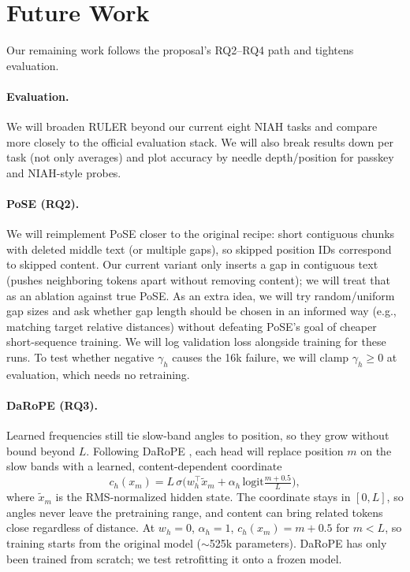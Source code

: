 \documentclass[11pt]{article}
\begin{document}


\section{Future Work}
\label{sec:future}
\label{sec:plan}

Our remaining work follows the proposal's RQ2--RQ4 path and tightens evaluation.

\paragraph{Evaluation.}
We will broaden RULER beyond our current eight NIAH tasks and compare more closely
to the official evaluation stack.
We will also break results down per task (not only averages) and plot
accuracy by needle depth/position for passkey and NIAH-style probes.

\paragraph{PoSE (RQ2).}
We will reimplement PoSE \citep{zhu2024pose} closer to the original recipe:
short contiguous chunks with deleted middle text (or multiple gaps), so skipped
position IDs correspond to skipped content.
Our current variant only inserts a gap in contiguous text (pushes neighboring tokens
apart without removing content); we will treat that as an ablation against true PoSE.
As an extra idea, we will try random/uniform gap sizes and ask whether gap
length should be chosen in an informed way (e.g., matching target relative distances)
without defeating PoSE's goal of cheaper short-sequence training.
We will log validation loss alongside training for these runs.
To test whether negative $\gamma_h$ causes the 16k failure, we will clamp $\gamma_h \geq 0$
at evaluation, which needs no retraining.

\paragraph{DaRoPE (RQ3).}
Learned frequencies still tie slow-band angles to position, so they grow without bound beyond $L$. Following DaRoPE \citep{levy2026darope}, each head will replace position $m$ on the slow bands with a learned, content-dependent coordinate
\begin{equation}
c_h(x_m) = L\,\sigma\!\Big(w_h^\top \tilde x_m + \alpha_h\,\mathrm{logit}\tfrac{m+0.5}{L}\Big),
\end{equation}
where $\tilde x_m$ is the RMS-normalized hidden state. The coordinate stays in $[0, L]$, so angles never leave the pretraining range, and content can bring related tokens close regardless of distance. At $w_h = 0$, $\alpha_h = 1$, $c_h(x_m) = m + 0.5$ for $m < L$, so training starts from the original model (${\sim}$525k parameters). DaRoPE has only been trained from scratch; we test retrofitting it onto a frozen model.
\end{document}
